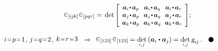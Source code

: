 \begin{otherlanguage}{russian}
\nopagebreak\vspace{-0.2em}\begin{equation*}
\permutationsparitysymbols{i\hspace{-0.1ex}j\hspace{-0.1ex}k} \permutationsparitysymbols{pqr} = \hspace{0.25ex}
\operatorname{det}\hspace{-0.1ex}
\scalebox{0.92}[0.92]{$\left[\hspace{-0.16ex}\begin{array}{c@{\hspace{.64em}}c@{\hspace{.64em}}c}
\bm{a}_i \narrowdotp\hspace{.12ex} \bm{a}_p & \bm{a}_i \narrowdotp\hspace{.12ex} \bm{a}_q & \bm{a}_i \narrowdotp\hspace{.12ex} \bm{a}_r \\
\bm{a}_j \narrowdotp\hspace{.12ex} \bm{a}_p & \bm{a}_j \narrowdotp\hspace{.12ex} \bm{a}_q & \bm{a}_j \narrowdotp\hspace{.12ex} \bm{a}_r \\
\bm{a}_k \narrowdotp\hspace{.12ex} \bm{a}_p & \bm{a}_k \narrowdotp\hspace{.12ex} \bm{a}_q & \bm{a}_k \narrowdotp\hspace{.12ex} \bm{a}_r
\end{array}\hspace{-0.12ex}\right]$} ;
\end{equation*}

\vspace{-0.1em} \noindent
${i \narroweq p \narroweq 1}$, ${j \narroweq q \narroweq 2}$, ${k \narroweq r \narroweq 3}$ ${\,\Rightarrow}$ ${\permutationsparitysymbols{123} \hspace{.2ex} \permutationsparitysymbols{123} \hspace{-0.15ex} = \underset{\raisebox{.15em}{\scalebox{.7}{$i$,$\hspace{.15ex}j$}}}{\operatorname{det}} \left( \bm{a}_i \dotp \bm{a}_j \right) \hspace{-0.1ex} = \underset{\raisebox{.15em}{\scalebox{.7}{$i$,$\hspace{.15ex}j$}}}{\operatorname{det}} \, \textsl{g}_{i\hspace{-0.1ex}j}}$.
${ \hspace{.6em}
\tikz[baseline=-0.6ex] \draw [color=black, fill=black] (0, 0) circle (.8ex); }$


\end{otherlanguage}
